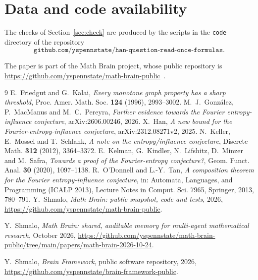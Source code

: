 \documentclass[11pt]{amsart}
\theoremstyle{definition}\newtheorem{definition}[theorem]{Definition}
\theoremstyle{remark}\newtheorem{remark}[theorem]{Remark}
\begin{document}
\section*{Data and code availability}

The checks of Section~\ref{sec:check} are produced by the scripts in the \texttt{code} directory of the repository
\[
\texttt{github.com/yspennstate/han-question-read-once-formulas}.
\]

The paper is part of the Math Brain project, whose public repository is \url{https://github.com/yspennstate/math-brain-public}~\cite{MathBrainRepo}.

\begin{thebibliography}{9}
 E.~Friedgut and G.~Kalai, \emph{Every monotone graph property has a sharp threshold}, Proc. Amer. Math.
Soc. \textbf{124} (1996), 2993--3002.
 M.~J.~Gonz\'alez, P.~MacManus and M.~C.~Pereyra, \emph{Further evidence towards the Fourier
entropy-influence conjecture}, arXiv:2606.00246, 2026.
 X.~Han, \emph{A new bound for the Fourier-entropy-influence conjecture}, arXiv:2312.08271v2, 2025.
 N.~Keller, E.~Mossel and T.~Schlank, \emph{A note on the entropy/influence conjecture}, Discrete Math.
\textbf{312} (2012), 3364--3372.
 E.~Kelman, G.~Kindler, N.~Lifshitz, D.~Minzer and M.~Safra, \emph{Towards a proof of the
Fourier-entropy conjecture?}, Geom. Funct. Anal. \textbf{30} (2020), 1097--1138.
 R.~O'Donnell and L.-Y.~Tan, \emph{A composition theorem for the Fourier entropy-influence conjecture},
in: Automata, Languages, and Programming (ICALP 2013), Lecture Notes in Comput. Sci. 7965, Springer, 2013, 780--791.
 Y.~Shmalo, \emph{Math Brain: public snapshot, code and tests}, 2026, \url{https://github.com/yspennstate/math-brain-public}.

 Y.~Shmalo, \emph{Math Brain: shared, auditable memory for multi-agent mathematical research}, October 2026, \url{https://github.com/yspennstate/math-brain-public/tree/main/papers/math-brain-2026-10-24}.

 Y.~Shmalo, \emph{Brain Framework}, public software repository, 2026, \url{https://github.com/yspennstate/brain-framework-public}.

\end{thebibliography}
\end{document}
